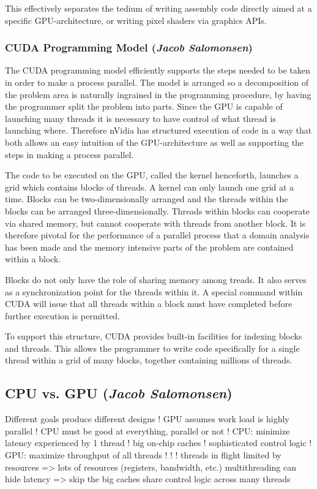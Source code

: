 This effectively separates the tedium of writing assembly code directly aimed at a specific GPU-architecture, or writing pixel shaders via graphics APIs.

\subsubsection{CUDA Programming Model (\textit{Jacob Salomonsen})}
The CUDA programming model efficiently supports the steps needed to be taken in order to make a process parallel. The model is arranged so a decomposition of the problem area is naturally ingrained in the programming procedure, by having the programmer split the problem into parts. Since the GPU is capable of launching many threads it is necessary to have control of what thread is launching where. Therefore nVidia has structured execution of code in a way that both allows an easy intuition of the GPU-architecture as well as supporting the steps in making a process parallel.

The code to be executed on the GPU, called the kernel henceforth, launches a grid which contains blocks of threads. A kernel can only launch one grid at a time. Blocks can be two-dimensionally arranged and the threads within the blocks can be arranged three-dimensionally. Threads within blocks can cooperate via shared memory, but cannot cooperate with threads from another block. It is therefore pivotal for the performance of a parallel process that a domain analysis has been made and the memory intensive parts of the problem are contained within a block.

Blocks do not only have the role of sharing memory among treads. It also serves as a synchronization point for the threads within it. A special command within CUDA will issue that all threads within a block must have completed before further execution is permitted.

To support this structure, CUDA provides built-in facilities for indexing blocks and threads. This allows the programmer to write code specifically for a single thread within a grid of many blocks, together containing millions of threads.

\subsection{CPU vs. GPU (\textit{Jacob Salomonsen})}
  Different goals produce different designs !   GPU assumes work load is highly parallel !   CPU must be good at everything, parallel or not
!   CPU: minimize latency experienced by 1 thread !   big on-chip caches !   sophisticated control logic
!   GPU: maximize throughput of all threads
!  
!   !  
threads in flight limited by resources => lots of resources (registers, bandwidth, etc.)
multithreading can hide latency => skip the big caches share control logic across many threads
